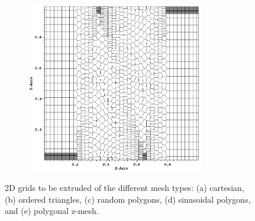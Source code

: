 \begin{figure}
\begin{subfigure}[b]{0.45\textwidth}
		\includegraphics[width=0.85\textwidth]{figures/sec_DSA/SIP_z_poly_mesh.png}
		\caption{}
	\end{subfigure}
\caption{2D grids to be extruded of the different mesh types: (a) cartesian, (b) ordered triangles, (c) random polygons, (d) sinusoidal polygons, and (e) polygonal z-mesh.}
\label{fig::SIP_mesh_slices}
\end{figure}

